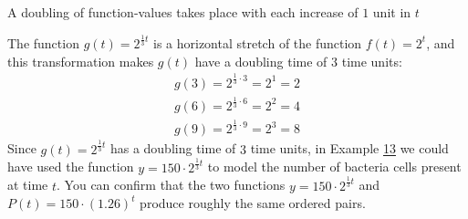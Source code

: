 \documentclass[10pt,]{book}
\theoremstyle{plain}
\theoremstyle{definition}
\theoremstyle{definition}
\theoremstyle{definition}
\numberwithin{equation}{section}
\begin{document}
A doubling of function-values takes place with each increase of \(1\) unit in \(t\)%
\par
The function \(g(t)=2^{\frac{1}{3} t}\) is a horizontal stretch of the function \(f(t)=2^t\), and this transformation makes \(g(t)\) have a doubling time of \(3\) time units:%
%
\begin{gather*}
g(3)=2^{\frac{1}{3} \cdot 3}=2^1=2\\
g(6)=2^{\frac{1}{3} \cdot 6}=2^2=4\\
g(9)=2^{\frac{1}{3} \cdot 9}=2^3=8
\end{gather*}
Since \(g(t)=2^{\frac{1}{3} t}\) has a doubling time of \(3\) time units, in Example \hyperref[example-doubling-time]{13} we could have used the function \(y = 150 \cdot 2^{\frac{1}{3} t}\) to model the number of bacteria cells present at time \(t\). You can confirm that the two functions \(y = 150 \cdot 2^{\frac{1}{3} t}\) and \(P(t)=150 \cdot (1.26)^t\) produce roughly the same ordered pairs.%
\typeout{************************************************}
\typeout{************************************************}
\end{document}
